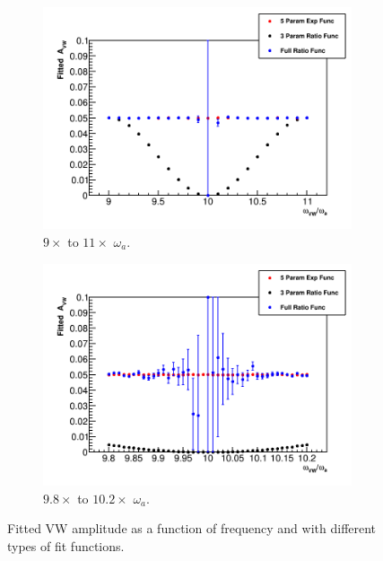 \documentclass[12pt,letterpaper]{article}
\def\wa{$\omega_{a}$\xspace}
\begin{document}
\begin{figure}[]
\centering
    \begin{subfigure}[]{0.46\textwidth}
        \centering
        \includegraphics[width=\textwidth]{Fitted_Avw_Vs_Wvw-9x-10x}
        \caption{$9\times$ to $11\times$ \wa.}
    \end{subfigure}%
    \hspace{1cm}
    \begin{subfigure}[]{0.46\textwidth}
        \centering
        \includegraphics[width=\textwidth]{Fitted_Avw_Vs_Wvw-10x}
        \caption{$9.8\times$ to $10.2\times$ \wa.}
    \end{subfigure}
\caption[]{Fitted VW amplitude as a function of frequency and with different types of fit functions. }
\label{fig:FittedAVW_myToyMC}
\end{figure}
\end{document}
